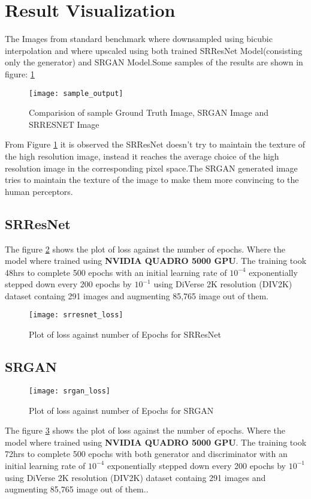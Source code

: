 \section{Result Visualization}
The Images from standard benchmark where downsampled using bicubic interpolation and where upscaled using both trained SRResNet Model(consisting only the generator) and SRGAN Model.Some samples of the results are shown in figure: \ref{fig:sampleoutput} 
\begin{figure}[h]
\centering
\texttt{[image: sample\_output]}
\caption{Comparision of sample Ground Truth Image, SRGAN Image and SRRESNET Image}
\label{fig:sampleoutput}
\end{figure}
From Figure \ref{fig:sampleoutput} it is observed the SRResNet doesn't try to maintain the texture of the high resolution image, instead it reaches the average choice of the high resolution image in the corresponding pixel space.The SRGAN generated image tries to maintain the texture of the image to make them more convincing to the human perceptors.
\subsection{SRResNet}
The figure \ref{fig:srresnetloss} shows the plot of loss against the number of epochs. Where the model where trained using \textbf{NVIDIA QUADRO 5000 GPU}. The training took 48hrs to complete 500 epochs with an initial learning rate of $10^{-4}$ exponentially stepped down every 200 epochs by $10^{-1}$ using DiVerse 2K resolution (DIV2K) dataset containg 291 images and augmenting 85,765 image out of them.
\begin{figure}[h]
\centering
\texttt{[image: srresnet\_loss]}
\caption{Plot of loss against number of Epochs for SRResNet}
\label{fig:srresnetloss}
\end{figure}
\subsection{SRGAN}
\begin{figure}[h]
\centering
\texttt{[image: srgan\_loss]}
\caption{Plot of loss against number of Epochs for SRGAN}
\label{fig:srganloss}
\end{figure}
The figure \ref{fig:srganloss} shows the plot of loss against the number of epochs. Where the model where trained using \textbf{NVIDIA QUADRO 5000 GPU}. The training took 72hrs to complete 500 epochs with both generator and discriminator with an initial learning rate of $10^{-4}$ exponentially stepped down every 200 epochs by $10^{-1}$ using DiVerse 2K resolution (DIV2K) dataset containg 291 images and augmenting 85,765 image out of them..
